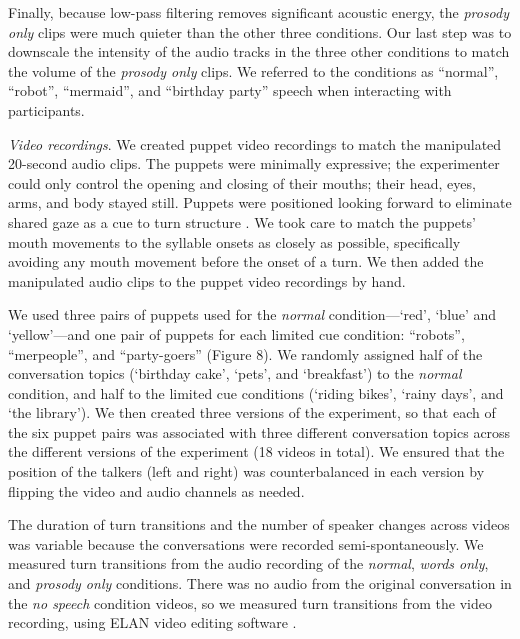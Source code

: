 \documentclass[authoryear, 12pt]{elsarticle}
\begin{document}
Finally, because low-pass filtering removes significant acoustic energy, the \textit{prosody only} clips were much quieter than the other three conditions. Our last step was to downscale the intensity of the audio tracks in the three other conditions to match the volume of the \textit{prosody only} clips. We referred to the conditions as ``normal'', ``robot'', ``mermaid'', and ``birthday party'' speech when interacting with participants.

\textit{Video recordings}. We created puppet video recordings to match the manipulated 20-second audio clips. The puppets were minimally expressive; the experimenter could only control the opening and closing of their mouths; their head, eyes, arms, and body stayed still. Puppets were positioned looking forward to eliminate shared gaze as a cue to turn structure \citep{thorgrimsson2015}. We took care to match the puppets' mouth movements to the syllable onsets as closely as possible, specifically avoiding any mouth movement before the onset of a turn. We then added the manipulated audio clips to the puppet video recordings by hand.

We used three pairs of puppets used for the \textit{normal} condition---`red', `blue' and `yellow'---and one pair of puppets for each limited cue condition: ``robots'', ``merpeople'', and ``party-goers'' (Figure 8). We randomly assigned half of the conversation topics (`birthday cake', `pets', and `breakfast') to the \textit{normal} condition, and half to the limited cue conditions (`riding bikes', `rainy days', and `the library'). We then created three versions of the experiment, so that each of the six puppet pairs was associated with three different conversation topics across the different versions of the experiment (18 videos in total). We ensured that the position of the talkers (left and right) was counterbalanced in each version by flipping the video and audio channels as needed.

The duration of turn transitions and the number of speaker changes across videos was variable because the conversations were recorded semi-spontaneously. We measured turn transitions from the audio recording of the \textit{normal}, \textit{words only}, and \textit{prosody only} conditions. There was no audio from the original conversation in the \textit{no speech} condition videos, so we measured turn transitions from the video recording, using ELAN video editing software \citep{ELAN}. 
\end{document}
